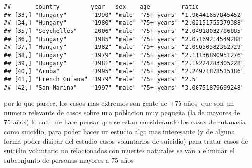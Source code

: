 \documentclass[]{article}
\newenvironment{Shaded}{\begin{snugshade}}{\end{snugshade}}
\newcommand{\KeywordTok}[1]{\textcolor[rgb]{0.13,0.29,0.53}{\textbf{#1}}}
\newcommand{\DataTypeTok}[1]{\textcolor[rgb]{0.13,0.29,0.53}{#1}}
\newcommand{\DecValTok}[1]{\textcolor[rgb]{0.00,0.00,0.81}{#1}}
\newcommand{\FloatTok}[1]{\textcolor[rgb]{0.00,0.00,0.81}{#1}}
\newcommand{\StringTok}[1]{\textcolor[rgb]{0.31,0.60,0.02}{#1}}
\newcommand{\OperatorTok}[1]{\textcolor[rgb]{0.81,0.36,0.00}{\textbf{#1}}}
\newcommand{\NormalTok}[1]{#1}
\begin{document}
\begin{Shaded}
\end{Shaded}

\begin{verbatim}
##       country         year   sex    age         ratio             
## [33,] "Hungary"       "1990" "male" "75+ years" "1.96441657845452"
## [34,] "Hungary"       "1980" "male" "75+ years" "2.02151755379388"
## [35,] "Seychelles"    "2006" "male" "75+ years" "2.04918032786885"
## [36,] "Hungary"       "1985" "male" "75+ years" "2.07169214549288"
## [37,] "Hungary"       "1982" "male" "75+ years" "2.09650582362729"
## [38,] "Hungary"       "1979" "male" "75+ years" "2.11136890951276"
## [39,] "Hungary"       "1981" "male" "75+ years" "2.19224283305228"
## [40,] "Aruba"         "1995" "male" "75+ years" "2.24971878515186"
## [41,] "French Guiana" "1979" "male" "75+ years" "2.5"             
## [42,] "San Marino"    "1997" "male" "75+ years" "3.00751879699248"
\end{verbatim}

por lo que parece, los casos mas extremos son gente de +75 años, que son
un numero relevante de casos sobre una poblacion muy pequeña (la de
mayores de 75 años) lo cual me hace pensar que se estan considerando los
casos de eutanasia como suicidio, para poder hacer un estudio algo mas
interesante (y de alguna forma poder disipar del estudio casos
voluntarios de suicidio) para tratar casos de suicidio voluntario no
relacionados con muertes naturales se van a eliminar el subconjunto de
personas mayores a 75 años
\end{document}
